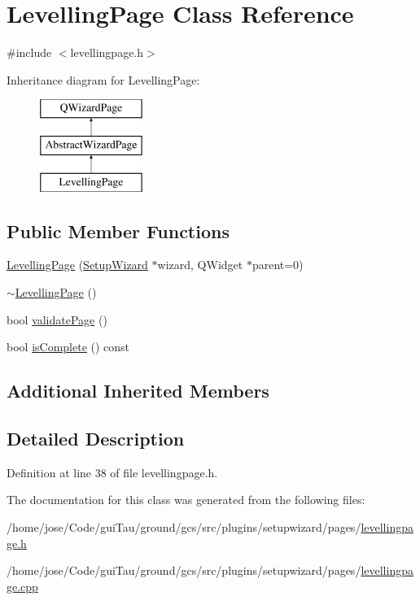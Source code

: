 \hypertarget{class_levelling_page}{\section{Levelling\-Page Class Reference}
\label{class_levelling_page}
}


{\ttfamily \#include $<$levellingpage.\-h$>$}

Inheritance diagram for Levelling\-Page\-:\begin{figure}[H]
\begin{center}
\leavevmode
\includegraphics[height=3.000000cm]{class_levelling_page}
\end{center}
\end{figure}
\subsection*{Public Member Functions}
\begin{DoxyCompactItemize}
\item 
\hyperlink{group___levelling_page_gaf6de9bbec0792b326f5611810012ef12}{Levelling\-Page} (\hyperlink{class_setup_wizard}{Setup\-Wizard} $\ast$wizard, Q\-Widget $\ast$parent=0)
\item 
\hyperlink{group___levelling_page_gab1c2df7313f33c1cca1e3e26138ed500}{$\sim$\-Levelling\-Page} ()
\item 
bool \hyperlink{group___levelling_page_gabfdb678df9700eb1f74286bfee0ace5c}{validate\-Page} ()
\item 
bool \hyperlink{group___levelling_page_gab7ca9c734d7d75df84c8dcd7a603de58}{is\-Complete} () const 
\end{DoxyCompactItemize}
\subsection*{Additional Inherited Members}


\subsection{Detailed Description}


Definition at line 38 of file levellingpage.\-h.



The documentation for this class was generated from the following files\-:\begin{DoxyCompactItemize}
\item 
/home/jose/\-Code/gui\-Tau/ground/gcs/src/plugins/setupwizard/pages/\hyperlink{levellingpage_8h}{levellingpage.\-h}\item 
/home/jose/\-Code/gui\-Tau/ground/gcs/src/plugins/setupwizard/pages/\hyperlink{levellingpage_8cpp}{levellingpage.\-cpp}\end{DoxyCompactItemize}
